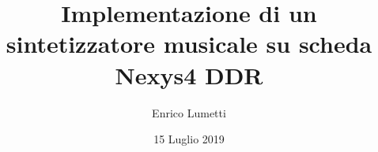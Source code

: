 \documentclass[italian,a4paper,12pt]{book}
\begin{document}
\author{Enrico Lumetti}
\title{Implementazione di un sintetizzatore musicale su scheda Nexys4 DDR}
\date{15 Luglio 2019}

\frontmatter
\maketitle
\tableofcontents

\mainmatter









\backmatter
\end{document}
